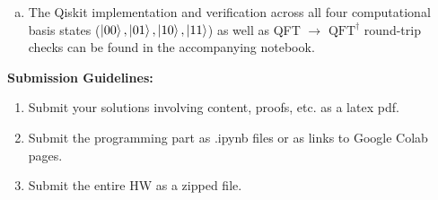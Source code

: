 \documentclass{article}
\begin{document}
\begin{enumerate}[(a)]
    Now compare this with the standard definition of the 2-qubit inverse QFT, whose matrix elements are given by $(\text{QFT}_2^\dagger)_{jk} = \frac{1}{\sqrt{4}} \omega^{-jk}$ where $\omega = e^{2\pi i / 4} = i$ (so $\omega^{-1} = -i$):
    \[
    \text{QFT}_2^\dagger = \frac{1}{2} \begin{bmatrix}
        1 & 1 & 1 & 1 \\
        1 & (-i)^1 & (-i)^2 & (-i)^3 \\
        1 & (-i)^2 & (-i)^4 & (-i)^6 \\
        1 & (-i)^3 & (-i)^6 & (-i)^9
    \end{bmatrix} = \frac{1}{2} \begin{bmatrix}
        1 & 1 & 1 & 1 \\
        1 & -i & -1 & i \\
        1 & -1 & 1 & -1 \\
        1 & i & -1 & -i
    \end{bmatrix}
    \]
    Note that because Qiskit and standard circuit diagrams order wires top-to-bottom ($\ket{q_0}$ on top, $\ket{q_1}$ on bottom), applying SWAP first followed by $H_0$, $CS^\dagger_{0,1}$, $H_1$ maps $\ket{j_0 j_1} \mapsto \frac{1}{2}\sum_{k_0, k_1} e^{-2\pi i (2j_0 + j_1)(2k_0 + k_1)/4} \ket{k_0 k_1}$ (with output bits reversed unless unswapped, matching the standard $\text{QFT}^\dagger$ circuit convention where $\text{QFT}_2 \cdot \text{QFT}_2^\dagger = I$). Specifically, if $\text{QFT}_2$ is defined as $U_{\text{SWAP}}(H \otimes I)(CS)(I \otimes H)$, then taking its conjugate transpose gives:
    \[
    \text{QFT}_2^\dagger = \big(U_{\text{SWAP}}(H \otimes I)(CS)(I \otimes H)\big)^\dagger = (I \otimes H)^\dagger (CS)^\dagger (H \otimes I)^\dagger U_{\text{SWAP}}^\dagger = (I \otimes H)(CS^\dagger)(H \otimes I)U_{\text{SWAP}}
    \]
    Since $CS^\dagger = CT^6$ and $U_{\text{SWAP}} = \text{CNOT}_{0,1}\text{CNOT}_{1,0}\text{CNOT}_{0,1}$, the constructed circuit is algebraically identical to the original inverse QFT circuit. $\qed$

    \item The Qiskit implementation and verification across all four computational basis states ($\ket{00}, \ket{01}, \ket{10}, \ket{11}$) as well as QFT $\rightarrow$ $\text{QFT}^\dagger$ round-trip checks can be found in the accompanying notebook.
\end{enumerate}

\textbf{Submission Guidelines:}
\begin{enumerate}
\item Submit your solutions involving content, proofs, etc. as a latex pdf.
\item Submit the programming part as .ipynb files or as links to Google Colab
pages.
\item Submit the entire HW as a zipped file.
\end{enumerate}
\end{document}
